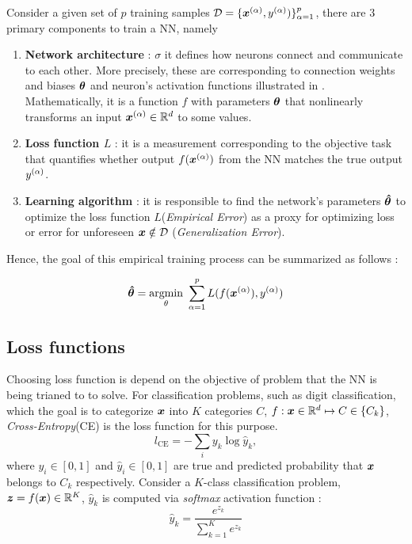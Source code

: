 Consider a given set of $p$ training samples $\mathcal{D} = \{ \xa, \ya) \}_{\alpha=1}^{p}$,  there are 3 primary components to train a NN, namely  
\begin{enumerate}
	\item \textbf{Network architecture} : $\sigma$ it defines how neurons connect and communicate to each other. More precisely, these are corresponding to connection weights and biases $\patvector{\theta}$ and neuron's activation functions illustrated in \addfigure{\ref{fig:nn_typical_structure}}. Mathematically, it is a function $f$ with parameters $\patvector{\theta}$ that nonlinearly transforms an input $\xa\in \mathbb{R}^d $ to some values.
	\item \textbf{Loss function $L$} : it is a measurement corresponding to the objective task that quantifies whether output $f(\xa)$ from the NN matches the true output $y^{(\alpha)}$.
	\item \textbf{Learning algorithm} : it is responsible to find the network's parameters $\patvector{\hat{\theta}}$ to optimize the loss function $L$(\textit{Empirical Error})  as a proxy for optimizing loss or error for unforeseen $\boldsymbol{x} \notin \mathcal{D} $ (\textit{Generalization Error}). 
\end{enumerate}

Hence, the goal of this empirical training process can be summarized as follows : 

\begin{align}
	\patvector{\hat{\theta}} = \patarg{min}{\theta} \sum_{\alpha=1}^p L( f(\xa), \ya) 
\end{align}

\subsection{Loss functions}
Choosing loss function is depend on the objective of problem that the NN is being trianed to to solve. For classification problems, such as digit classification, which the goal is to categorize $\boldsymbol{x}$ into $K$ categories $C$, $f : \boldsymbol{x} \in \mathbb{R}^d  \mapsto C \in \{ C_k \}$, \textit{Cross-Entropy}(CE) is the loss function for this purpose.
$$
l_{\text{CE}} = - \sum_{i} y_k \log \hat{y}_k,
$$
where $y_i \in [0, 1]$ and $\hat{y}_i \in [0, 1]$ are true and predicted probability that $\boldsymbol{x}$ belongs to $C_k$ respectively. Consider a $K$-class classification problem, $\patvector{z} = f(\x) \in \mathbb{R}^{K}$, $\hat{y}_k$ is computed via \textit{softmax} activation function :
$$
\hat{y}_k = \frac{e^{z_k}}{ \sum_{k=1}^K{e^{z_k}} }
$$ 

